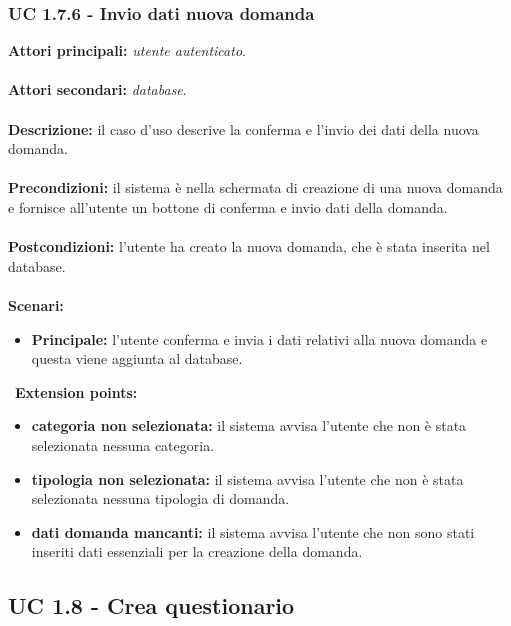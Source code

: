\documentclass[a4paper,11pt]{article}
\begin{document}
\subsubsection{UC 1.7.6 - Invio dati nuova domanda}

\textbf{Attori principali:} \textit{utente autenticato}.\\
\\
\textbf{Attori secondari:} \textit{database}.\\
\\
\textbf{Descrizione:} il caso d'uso descrive la conferma e l'invio dei dati della nuova domanda. \\
\\
\textbf{Precondizioni:} il sistema è nella schermata di creazione di una nuova domanda e fornisce all'utente un bottone di conferma e invio dati della domanda.\\
\\
\textbf{Postcondizioni:} l'utente ha creato la nuova domanda, che è stata inserita nel database. \\
\\
\newpage
\textbf{Scenari:}
\begin{itemize}
\item \textbf{Principale:} l'utente conferma e invia i dati relativi alla nuova domanda e questa viene aggiunta al database.
\end{itemize}
\
\textbf{Extension points:}
\begin{itemize}
\item \textbf{categoria non selezionata:} il sistema avvisa l'utente che non è stata selezionata nessuna categoria.
\item \textbf{tipologia non selezionata:} il sistema avvisa l'utente che non è stata selezionata nessuna tipologia di domanda.
\item \textbf{dati domanda mancanti:} il sistema avvisa l'utente che non sono stati inseriti dati essenziali per la creazione della domanda.
\end{itemize}

\newpage

\subsection{UC 1.8 - Crea questionario}
\end{document}
